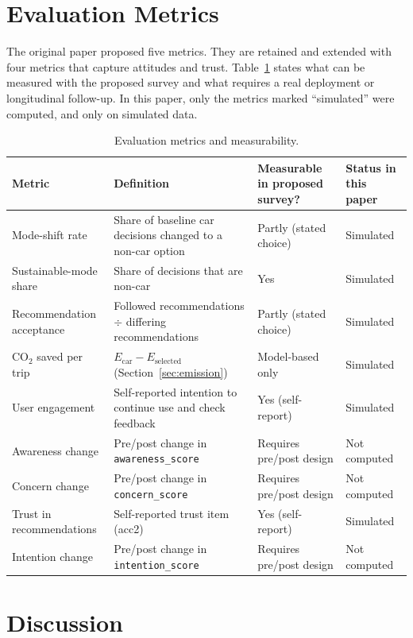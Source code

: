 \documentclass[11pt,a4paper]{article}
\newcommand{\code}[1]{\texttt{#1}}
\begin{document}
\section{Evaluation Metrics}
\label{sec:metrics}

The original paper proposed five metrics. They are retained and extended with four metrics that capture
attitudes and trust. Table~\ref{tab:metrics} states what can be measured with the proposed survey and
what requires a real deployment or longitudinal follow-up. In this paper, only the metrics marked
``simulated'' were computed, and only on simulated data.

\begin{table}[H]
\centering
\small
\caption{Evaluation metrics and measurability.}
\label{tab:metrics}
\begin{tabular}{@{}p{3.2cm}p{6.2cm}p{2.6cm}p{2.4cm}@{}}
\toprule
\textbf{Metric} & \textbf{Definition} & \textbf{Measurable in proposed survey?} & \textbf{Status in this paper}\\
\midrule
Mode-shift rate & Share of baseline car decisions changed to a non-car option & Partly (stated choice) & Simulated\\
Sustainable-mode share & Share of decisions that are non-car & Yes & Simulated\\
Recommendation acceptance & Followed recommendations $\div$ differing recommendations & Partly (stated choice) & Simulated\\
CO$_2$ saved per trip & $E_{\text{car}}-E_{\text{selected}}$ (Section~\ref{sec:emission}) & Model-based only & Simulated\\
User engagement & Self-reported intention to continue use and check feedback & Yes (self-report) & Simulated\\
Awareness change & Pre/post change in \code{awareness\_score} & Requires pre/post design & Not computed\\
Concern change & Pre/post change in \code{concern\_score} & Requires pre/post design & Not computed\\
Trust in recommendations & Self-reported trust item (acc2) & Yes (self-report) & Simulated\\
Intention change & Pre/post change in \code{intention\_score} & Requires pre/post design & Not computed\\
\bottomrule
\end{tabular}
\end{table}

\section{Discussion}
\label{sec:discussion}
\end{document}

